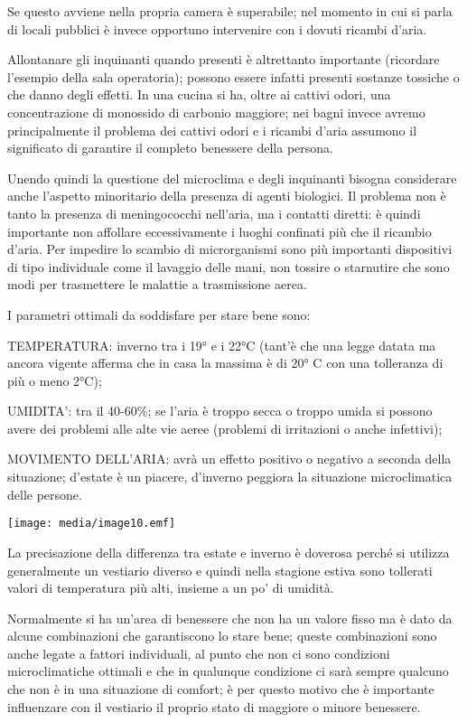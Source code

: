 \documentclass[]{article}
\begin{document}
Se questo avviene nella propria camera è superabile; nel momento in cui
si parla di locali pubblici è invece opportuno intervenire con i dovuti
ricambi d'aria.

Allontanare gli inquinanti quando presenti è altrettanto importante
(ricordare l'esempio della sala operatoria); possono essere infatti
presenti sostanze tossiche o che danno degli effetti. In una cucina si
ha, oltre ai cattivi odori, una concentrazione di monossido di carbonio
maggiore; nei bagni invece avremo principalmente il problema dei cattivi
odori e i ricambi d'aria assumono il significato di garantire il
completo benessere della persona.

Unendo quindi la questione del microclima e degli inquinanti bisogna
considerare anche l'aspetto minoritario della presenza di agenti
biologici. Il problema non è tanto la presenza di meningococchi
nell'aria, ma i contatti diretti: è quindi importante non affollare
eccessivamente i luoghi confinati più che il ricambio d'aria. Per
impedire lo scambio di microrganismi sono più importanti dispositivi di
tipo individuale come il lavaggio delle mani, non tossire o starnutire
che sono modi per trasmettere le malattie a trasmissione aerea.

I parametri ottimali da soddisfare per stare bene sono:

TEMPERATURA: inverno tra i 19° e i 22°C (tant'è che una legge datata ma
ancora vigente afferma che in casa la massima è di 20° C con una
tolleranza di più o meno 2°C);

UMIDITA': tra il 40-60\%; se l'aria è troppo secca o troppo umida si
possono avere dei problemi alle alte vie aeree (problemi di irritazioni
o anche infettivi);

MOVIMENTO DELL'ARIA: avrà un effetto positivo o negativo a seconda della
situazione; d'estate è un piacere, d'inverno peggiora la situazione
microclimatica delle persone.

\texttt{[image: media/image10.emf]}

La precisazione della differenza tra estate e inverno è doverosa perché
si utilizza generalmente un vestiario diverso e quindi nella stagione
estiva sono tollerati valori di temperatura più alti, insieme a un po'
di umidità.

Normalmente si ha un'area di benessere che non ha un valore fisso ma è
dato da alcune combinazioni che garantiscono lo stare bene; queste
combinazioni sono anche legate a fattori individuali, al punto che non
ci sono condizioni microclimatiche ottimali e che in qualunque
condizione ci sarà sempre qualcuno che non è in una situazione di
comfort; è per questo motivo che è importante influenzare con il
vestiario il proprio stato di maggiore o minore benessere.
\end{document}
